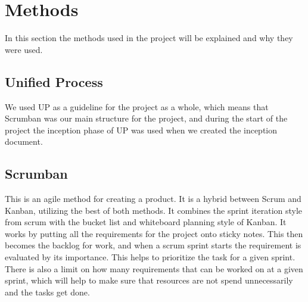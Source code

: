 
\chapter{Methods}

In this section the methods used in the project will be explained and why they were used.

\section{Unified Process}

We used UP as a guideline for the project as a whole, which means
that Scrumban was our main structure for the project, and during the
start of the project the inception phase of UP was used when we created
 the inception document.

\section{Scrumban}

This is an agile method for creating a product. It is a hybrid
between Scrum and Kanban, utilizing the best of both methods. It
 combines the sprint iteration style from scrum with the bucket list
  and whiteboard planning style of Kanban. It works by putting all the
   requirements for the project onto sticky notes. This then becomes the
    backlog for work, and when a scrum sprint starts the requirement is
     evaluated by its importance. This helps to prioritize the task for a
      given sprint. There is also a limit on how many requirements that can
       be worked on at a given sprint, which will help to make sure that
        resources are not spend unnecessarily and the tasks get done.
